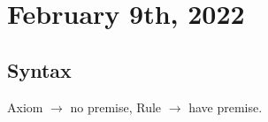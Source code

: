 \documentclass[../main/main.tex]{subfiles}
\begin{document}
\section{February 9th, 2022}
\subsection{Syntax}

Axiom \(\to\) no premise, Rule \(\to\) have premise.
\end{document}
